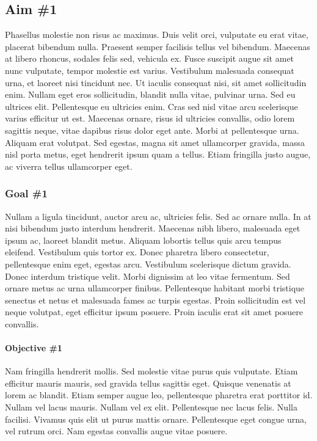 \subsection{Aim \#1}
Phasellus molestie non risus ac maximus. Duis velit orci, vulputate eu erat vitae, placerat bibendum nulla. Praesent semper facilisis tellus vel bibendum. Maecenas at libero rhoncus, sodales felis sed, vehicula ex. Fusce suscipit augue sit amet nunc vulputate, tempor molestie est varius. Vestibulum malesuada consequat urna, et laoreet nisi tincidunt nec. Ut iaculis consequat nisi, sit amet sollicitudin enim. Nullam eget eros sollicitudin, blandit nulla vitae, pulvinar urna. Sed eu ultrices elit. Pellentesque eu ultricies enim. Cras sed nisl vitae arcu scelerisque varius efficitur ut est. Maecenas ornare, risus id ultricies convallis, odio lorem sagittis neque, vitae dapibus risus dolor eget ante. Morbi at pellentesque urna. Aliquam erat volutpat. Sed egestas, magna sit amet ullamcorper gravida, massa nisl porta metus, eget hendrerit ipsum quam a tellus. Etiam fringilla justo augue, ac viverra tellus ullamcorper eget.

	\subsubsection{Goal \#1}
	Nullam a ligula tincidunt, auctor arcu ac, ultricies felis. Sed ac ornare nulla. In at nisi bibendum justo interdum hendrerit. Maecenas nibh libero, malesuada eget ipsum ac, laoreet blandit metus. Aliquam lobortis tellus quis arcu tempus eleifend. Vestibulum quis tortor ex. Donec pharetra libero consectetur, pellentesque enim eget, egestas arcu. Vestibulum scelerisque dictum gravida. Donec interdum tristique velit. Morbi dignissim at leo vitae fermentum. Sed ornare metus ac urna ullamcorper finibus. Pellentesque habitant morbi tristique senectus et netus et malesuada fames ac turpis egestas. Proin sollicitudin est vel neque volutpat, eget efficitur ipsum posuere. Proin iaculis erat sit amet posuere convallis.

		\paragraph{Objective \#1}
		Nam fringilla hendrerit mollis. Sed molestie vitae purus quis vulputate. Etiam efficitur mauris mauris, sed gravida tellus sagittis eget. Quisque venenatis at lorem ac blandit. Etiam semper augue leo, pellentesque pharetra erat porttitor id. Nullam vel lacus mauris. Nullam vel ex elit. Pellentesque nec lacus felis. Nulla facilisi. Vivamus quis elit ut purus mattis ornare. Pellentesque eget congue urna, vel rutrum orci. Nam egestas convallis augue vitae posuere.


